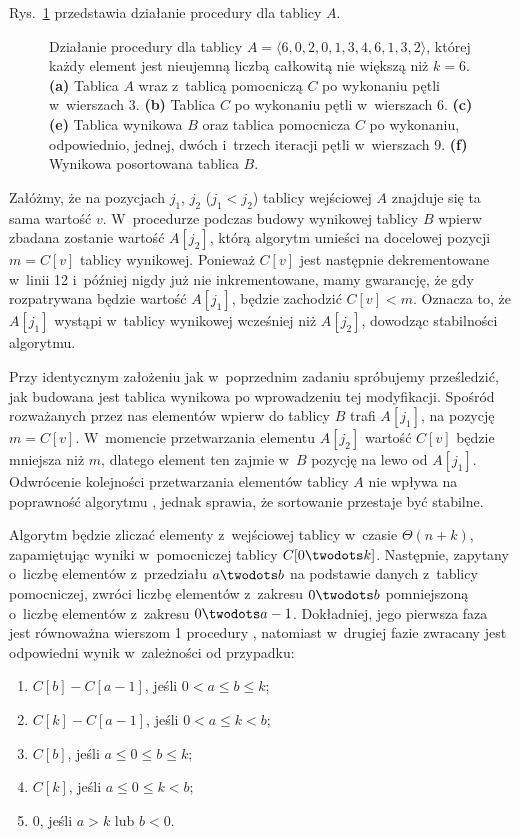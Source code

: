
\exercise %
Rys.\ \ref{fig:8.2-1} przedstawia działanie procedury  dla tablicy $A$.
\begin{figure}[!ht]
	\centering 
	\caption{Działanie procedury  dla tablicy $A=\langle6,0,2,0,1,3,4,6,1,3,2\rangle$, której każdy element jest nieujemną liczbą całkowitą nie większą niż $k=6$.
{\sffamily\bfseries(a)} Tablica $A$ wraz z~tablicą pomocniczą $C$ po wykonaniu pętli w~wierszach 3.
{\sffamily\bfseries(b)} Tablica $C$ po wykonaniu pętli w~wierszach 6.
{\sffamily\bfseries(c)\nbendash(e)} Tablica wynikowa $B$ oraz tablica pomocnicza $C$ po wykonaniu, odpowiednio, jednej, dwóch i~trzech iteracji pętli  w~wierszach 9.
{\sffamily\bfseries(f)} Wynikowa posortowana tablica $B$.} \label{fig:8.2-1}
\end{figure}

\exercise %
Załóżmy, że na pozycjach $j_1$, $j_2$ ($j_1<j_2$) tablicy wejściowej $A$ znajduje się ta sama wartość $v$.
W~procedurze  podczas budowy wynikowej tablicy $B$ wpierw zbadana zostanie wartość $A[j_2]$, którą algorytm umieści na docelowej pozycji $m=C[v]$ tablicy wynikowej.
Ponieważ $C[v]$ jest następnie dekrementowane w~linii 12 i~później nigdy już nie inkrementowane, mamy gwarancję, że gdy rozpatrywana będzie wartość $A[j_1]$, będzie zachodzić $C[v]<m$.
Oznacza to, że $A[j_1]$ wystąpi w~tablicy wynikowej wcześniej niż $A[j_2]$, dowodząc stabilności algorytmu.

\exercise %
Przy identycznym założeniu jak w~poprzednim zadaniu spróbujemy prześledzić, jak budowana jest tablica wynikowa po wprowadzeniu tej modyfikacji.
Spośród rozważanych przez nas elementów wpierw do tablicy $B$ trafi $A[j_1]$, na pozycję $m=C[v]$.
W~momencie przetwarzania elementu $A[j_2]$ wartość $C[v]$ będzie mniejsza niż $m$, dlatego element ten zajmie w~$B$ pozycję na lewo od $A[j_1]$.
Odwrócenie kolejności przetwarzania elementów tablicy $A$ nie wpływa na poprawność algorytmu , jednak sprawia, że sortowanie przestaje być stabilne.

\exercise %
Algorytm będzie zliczać elementy z~wejściowej tablicy w~czasie $\Theta(n+k)$, zapamiętując wyniki w~pomocniczej tablicy $C[0\twodots k]$.
Następnie, zapytany o~liczbę elementów z~przedziału $a\twodots b$ na podstawie danych z~tablicy pomocniczej, zwróci liczbę elementów z~zakresu $0\twodots b$ pomniejszoną o~liczbę elementów z~zakresu $0\twodots a-1$.
Dokładniej, jego pierwsza faza jest równoważna wierszom 1 procedury , natomiast w~drugiej fazie zwracany jest odpowiedni wynik w~zależności od przypadku:
\begin{enumerate}
	\renewcommand{\labelenumi}{(\roman{enumi})}
	\item $C[b]-C[a-1]$, jeśli $0<a\le b\le k$;
	\item $C[k]-C[a-1]$, jeśli $0<a\le k<b$;
	\item $C[b]$, jeśli $a\le0\le b\le k$;
	\item $C[k]$, jeśli $a\le0\le k<b$;
	\item 0, jeśli $a>k$ lub $b<0$.
\end{enumerate}
